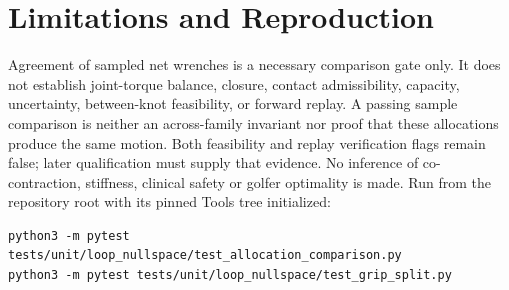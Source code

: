 \documentclass{article}
\begin{document}
\section{Limitations and Reproduction}
Agreement of sampled net wrenches is a necessary comparison gate only.
It does not establish joint-torque balance, closure, contact admissibility,
capacity, uncertainty, between-knot feasibility, or forward replay.
A passing sample comparison is neither an across-family invariant nor proof
that these allocations produce the same motion. Both feasibility and replay
verification flags remain false; later qualification must supply that evidence.
No inference of co-contraction, stiffness, clinical safety or golfer optimality
is made. Run from the repository root with its pinned Tools tree initialized:
\begin{verbatim}
python3 -m pytest tests/unit/loop_nullspace/test_allocation_comparison.py
python3 -m pytest tests/unit/loop_nullspace/test_grip_split.py
\end{verbatim}
\end{document}
